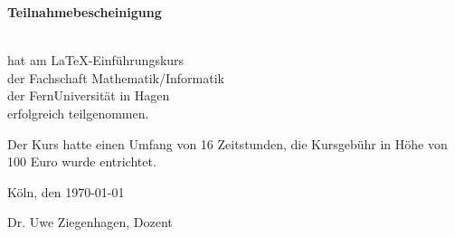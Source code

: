 \documentclass[16pt,ngerman]{scrartcl}
\begin{document}
{\centering\LARGE

\textbf{Teilnahmebescheinigung}
\vspace{10mm}
\begin{center}
\hdashrule[0.15ex]{12.5cm}{1pt}{2mm} \\
hat am \LaTeX-Einführungskurs \\
der Fachschaft Mathematik/Informatik \\ der FernUniversität in Hagen \\ erfolgreich teilgenommen.
\end{center}
\vspace{1cm}\huge
}
{\large Der Kurs hatte einen Umfang von 16 Zeitstunden, die Kursgebühr in Höhe von 100 Euro wurde entrichtet.}


\vspace{1.75cm}\Large\flushleft

Köln, den \today \hfill\hdashrule[0.15ex]{9.5cm}{1pt}{2mm}

{\vspace*{-0.25cm}\hspace*{12.2cm}\normalsize Dr. Uwe Ziegenhagen, Dozent}


\begin{center}
\vfill{}
\end{center}
\end{document}
